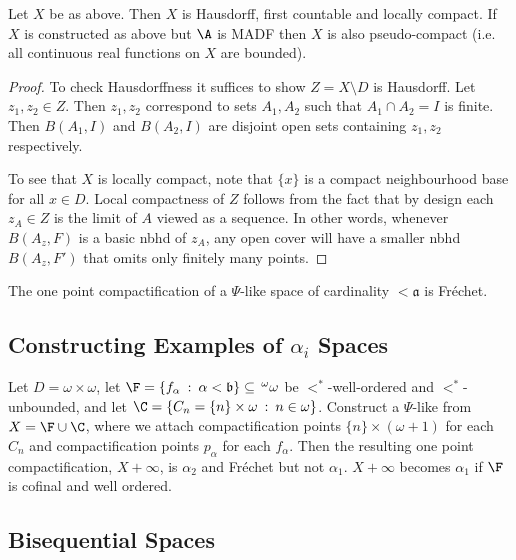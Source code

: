 \documentclass{article}
\begin{document}
\begin{prop}
    Let \(X\) be as above. Then \(X\) is Hausdorff, first countable and locally compact. If \(X\) is constructed as above but \(\A\) is MADF then \(X\) is also pseudo-compact (i.e. all continuous real functions on \(X\) are bounded).
\end{prop}

\begin{proof}
    To check Hausdorffness it suffices to show \(Z = X\setminus D\) is Hausdorff. Let \(z_1, z_2 \in Z\). Then \(z_1, z_2\) correspond to sets \(A_1, A_2\) such that \(A_1 \cap A_2 = I\) is finite. Then \(B(A_1, I)\) and \(B(A_2, I)\) are disjoint open sets containing \(z_1, z_2\) respectively. 

    To see that \(X\) is locally compact, note that \(\{x\}\) is a compact neighbourhood base for all \(x \in D\). Local compactness of \(Z\) follows from the fact that by design each \(z_A \in Z\) is the limit of \(A\) viewed as a sequence. In other words, whenever \(B(A_z, F)\) is a basic nbhd of \(z_A\), any open cover will have a smaller nbhd \(B(A_z, F')\) that omits only finitely many points.
\end{proof}

\begin{prop}
    The one point compactification of a \(\Psi\)-like space of cardinality \(<\mathfrak{a}\) is Fréchet. 
\end{prop}

\subsection{Constructing Examples of \(\alpha_i\) Spaces}

\begin{exam}
     Let \(D = \omega\times\omega\), let \(\F = \{f_{\alpha} \: : \: \alpha < \mathfrak{b}\} \subseteq \, ^\omega\omega\) be \(<^{\ast}\)-well-ordered and \(<^{\ast}\)-unbounded, and let \(\C = \{C_n = \{n\} \times \omega \: : \: n \in \omega\}\). Construct a \(\Psi\)-like from \(X = \F \cup \C\), where we attach compactification points \(\{n\} \times (\omega+1)\) for each \(C_n\) and compactification points \(p_{\alpha}\) for each \(f_{\alpha}\). Then the resulting one point compactification, \(X + \infty\), is \(\alpha_2\) and Fréchet but not \(\alpha_1\). \(X + \infty\) becomes \(\alpha_1\) if \(\F\) is cofinal and well ordered. 
\end{exam}

\subsection{Bisequential Spaces}
\end{document}
